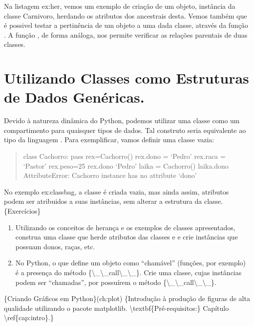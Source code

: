 \documentclass[a4paper,10pt,portuguese]{sphinxmanual}
\begin{document}
Na listagem ex:her, vemos um exemplo de criação de um objeto,
instância da classe Carnivoro, herdando os atributos dos ancestrais
desta. Vemos também que é possivel testar a pertinência de um
objeto a uma dada classe, através da função . A
função , de forma análoga, nos permite verificar as
relações parentais de duas classes.


\section{Utilizando Classes como Estruturas de Dados Genéricas.}
\label{CapObj:utilizando-classes-como-estruturas-de-dados-genericas}
Devido à natureza dinâmica do Python, podemos utilizar uma classe
como um compartimento para quaisquer tipos de dados. Tal construto
seria equivalente ao tipo  da linguagem . Para
exemplificar, vamos definir uma classe vazia:
\begin{quote}

class Cachorro: pass rex=Cachorro() rex.dono = `Pedro' rex.raca =
`Pastor' rex.peso=25 rex.dono `Pedro' laika = Cachorro() laika.dono
AttributeError: Cachorro instance has no attribute `dono'
\end{quote}

No exemplo ex:classbag, a classe  é criada vazia, mas
ainda assim, atributos podem ser atribuidos a suas instâncias, sem
alterar a estrutura da classe. \{Exercícios\}
\begin{enumerate}
\item {} 
Utilizando os conceitos de herança e os exemplos de classes
apresentados, construa uma classe  que herde atributos
das classes  e  e crie instâncias que
possuam donos, raças, etc.

\item {} 
No Python, o que define um objeto como ``chamável'' (funções, por
exemplo) é a presença do método \{\textbackslash{}\_\textbackslash{}\_call\textbackslash{}\_\textbackslash{}\_\}. Crie uma
classe, cujas instâncias podem ser ``chamadas'', por possuírem o
método \{\textbackslash{}\_\textbackslash{}\_call\textbackslash{}\_\textbackslash{}\_\}.

\end{enumerate}

\{Criando Gráficos em Python\}(ch:plot)
\{Introdução à produção de figuras de alta qualidade utilizando o pacote matplotlib. \textbackslash{}textbf\{Pré-requisitos:\} Capítulo \textbackslash{}ref\{cap:intro\}.\}
\end{document}
